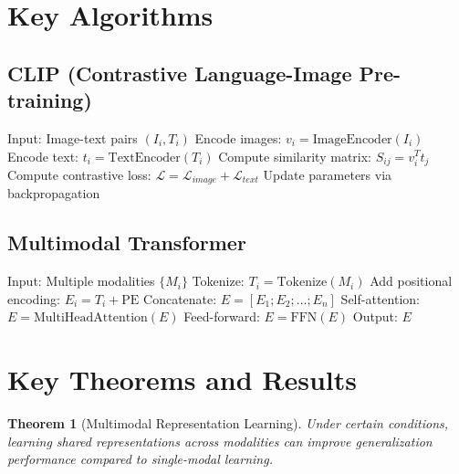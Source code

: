 \documentclass[11pt,a4paper]{article}
\newtheorem{theorem}{Theorem}[section]
\begin{document}
\section{Key Algorithms}

\subsection{CLIP (Contrastive Language-Image Pre-training)}

\begin{algorithm}
\caption{CLIP Training}
\begin{algorithmic}[1]
\STATE Input: Image-text pairs $(I_i, T_i)$
\STATE Encode images: $v_i = \text{ImageEncoder}(I_i)$
\STATE Encode text: $t_i = \text{TextEncoder}(T_i)$
\STATE Compute similarity matrix: $S_{ij} = v_i^T t_j$
\STATE Compute contrastive loss: $\mathcal{L} = \mathcal{L}_{image} + \mathcal{L}_{text}$
\STATE Update parameters via backpropagation
\end{algorithmic}
\end{algorithm}

\subsection{Multimodal Transformer}

\begin{algorithm}
\caption{Multimodal Transformer}
\begin{algorithmic}[1]
\STATE Input: Multiple modalities $\{M_i\}$
    \STATE Tokenize: $T_i = \text{Tokenize}(M_i)$
    \STATE Add positional encoding: $E_i = T_i + \text{PE}$
\ENDFOR
\STATE Concatenate: $E = [E_1; E_2; \ldots; E_n]$
    \STATE Self-attention: $E = \text{MultiHeadAttention}(E)$
    \STATE Feed-forward: $E = \text{FFN}(E)$
\ENDFOR
\STATE Output: $E$
\end{algorithmic}
\end{algorithm}

\section{Key Theorems and Results}

\begin{theorem}[Multimodal Representation Learning]
Under certain conditions, learning shared representations across modalities can improve generalization performance compared to single-modal learning.
\end{theorem}
\end{document}
